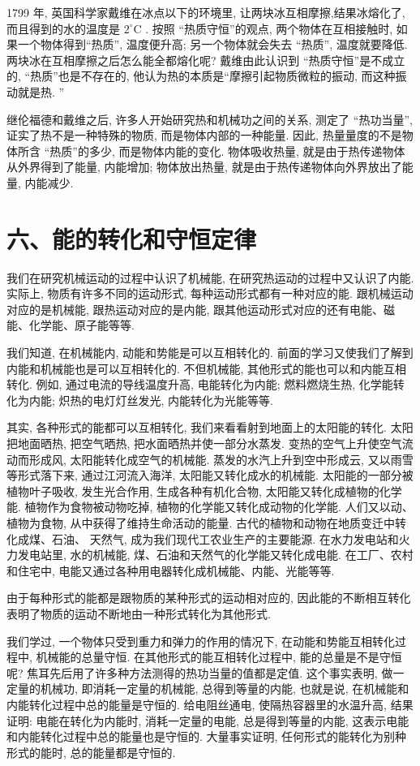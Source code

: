 \documentclass[10pt]{article}
\begin{document}
1799 年, 英国科学家戴维在冰点以下的环境里, 让两块冰互相摩擦,结果冰熔化了,而且得到的水的温度是 \({2}^{ \circ }\mathrm{C}\) . 按照 “热质守恒”的观点, 两个物体在互相接触时, 如果一个物体得到“热质”, 温度便升高; 另一个物体就会失去 “热质”, 温度就要降低. 两块冰在互相摩擦之后怎么能全都熔化呢? 戴维由此认识到 “热质守恒”是不成立的, “热质”也是不存在的, 他认为热的本质是“摩擦引起物质微粒的振动, 而这种振动就是热. ”

继伦福德和戴维之后, 许多人开始研究热和机械功之间的关系, 测定了 “热功当量”, 证实了热不是一种特殊的物质, 而是物体内部的一种能量. 因此, 热量量度的不是物体所含 “热质”的多少, 而是物体内能的变化. 物体吸收热量, 就是由于热传递物体从外界得到了能量, 内能增加; 物体放出热量, 就是由于热传递物体向外界放出了能量, 内能减少.

\section*{六、能的转化和守恒定律}

我们在研究机械运动的过程中认识了机械能, 在研究热运动的过程中又认识了内能. 实际上, 物质有许多不同的运动形式, 每种运动形式都有一种对应的能. 跟机械运动对应的是机械能, 跟热运动对应的是内能, 跟其他运动形式对应的还有电能、磁能、化学能、原子能等等.

我们知道, 在机械能内, 动能和势能是可以互相转化的. 前面的学习又使我们了解到内能和机械能也是可以互相转化的. 不但机械能, 其他形式的能也可以和内能互相转化. 例如, 通过电流的导线温度升高, 电能转化为内能; 燃料燃烧生热, 化学能转化为内能; 炽热的电灯灯丝发光, 内能转化为光能等等.

其实, 各种形式的能都可以互相转化, 我们来看看射到地面上的太阳能的转化. 太阳把地面晒热, 把空气晒热, 把水面晒热并使一部分水蒸发. 变热的空气上升使空气流动而形成风, 太阳能转化成空气的机械能. 蒸发的水汽上升到空中形成云, 又以雨雪等形式落下来, 通过江河流入海洋, 太阳能又转化成水的机械能. 太阳能的一部分被植物叶子吸收, 发生光合作用, 生成各种有机化合物, 太阳能又转化成植物的化学能. 植物作为食物被动物吃掉, 植物的化学能又转化成动物的化学能. 人们又以动、植物为食物, 从中获得了维持生命活动的能量. 古代的植物和动物在地质变迁中转化成煤、石油、 天然气, 成为我们现代工农业生产的主要能源. 在水力发电站和火力发电站里, 水的机械能, 煤、石油和天然气的化学能又转化成电能. 在工厂、农村和住宅中, 电能又通过各种用电器转化成机械能、内能、光能等等.

由于每种形式的能都是跟物质的某种形式的运动相对应的, 因此能的不断相互转化表明了物质的运动不断地由一种形式转化为其他形式.

我们学过, 一个物体只受到重力和弹力的作用的情况下, 在动能和势能互相转化过程中, 机械能的总量守恒. 在其他形式的能互相转化过程中, 能的总量是不是守恒呢? 焦耳先后用了许多种方法测得的热功当量的值都是定值. 这个事实表明, 做一定量的机械功, 即消耗一定量的机械能, 总得到等量的内能, 也就是说, 在机械能和内能转化过程中总的能量是守恒的. 给电阻丝通电, 使隔热容器里的水温升高, 结果证明: 电能在转化为内能时, 消耗一定量的电能, 总是得到等量的内能, 这表示电能和内能转化过程中总的能量也是守恒的. 大量事实证明, 任何形式的能转化为别种形式的能时, 总的能量都是守恒的.
\end{document}

